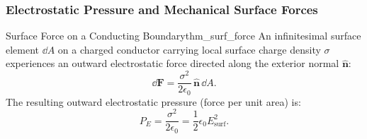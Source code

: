 \subsubsection{Electrostatic Pressure and Mechanical Surface Forces}

\begin{theorem}{Surface Force on a Conducting Boundary}{thm_surf_force}
An infinitesimal surface element \(\dd{A}\) on a charged conductor carrying local surface charge density \(\sigma\) experiences an outward electrostatic force directed along the exterior normal \(\hat{\bm{n}}\):
\begin{equation}
    \dd{\bm{F}} = \frac{\sigma^2}{2\epsilon_0}\,\hat{\bm{n}}\,\dd{A}.
\end{equation}
The resulting outward electrostatic pressure (force per unit area) is:
\begin{equation}
    P_E = \frac{\sigma^2}{2\epsilon_0} = \frac{1}{2}\epsilon_0 E_{\text{surf}}^2.
\end{equation}
\end{theorem}

